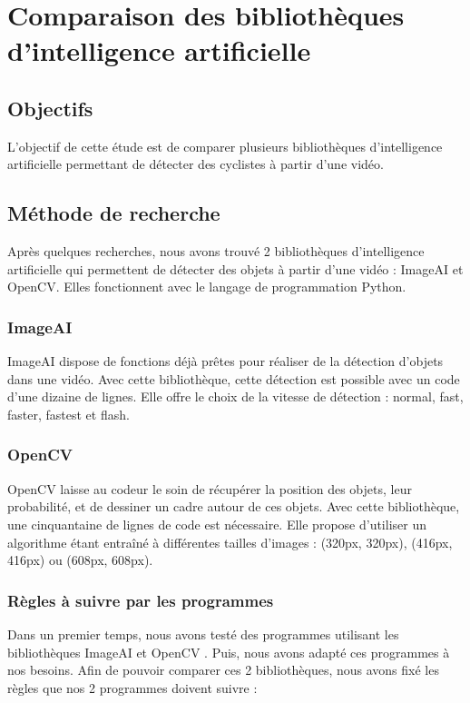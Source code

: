 \section{Comparaison des bibliothèques d'intelligence artificielle}
\label{sec:comparaisonIA}

\subsection{Objectifs}
\label{sec:comparaisonIA:objectifs}

L'objectif de cette étude est de comparer plusieurs bibliothèques d'intelligence artificielle
permettant de détecter des cyclistes à partir d'une vidéo.

\subsection{Méthode de recherche}
\label{sec:comparaisonIA:methode_recherche}

Après quelques recherches, nous avons trouvé 2 bibliothèques d'intelligence artificielle 
qui permettent de détecter des objets à partir d'une vidéo : ImageAI et OpenCV.
Elles fonctionnent avec le langage de programmation Python.

\subsubsection{ImageAI}
\label{sec:comparaisonIA:methode_recherche:imageAI}

ImageAI dispose de fonctions déjà prêtes pour réaliser de la détection d'objets dans une vidéo.
Avec cette bibliothèque, cette détection est possible avec un code d'une dizaine de lignes.
Elle offre le choix de la vitesse de détection : normal, fast, faster, fastest et flash.

\subsubsection{OpenCV}
\label{sec:comparaisonIA:methode_recherche:openCV}

OpenCV laisse au codeur le soin de récupérer la position des objets, leur probabilité, et de dessiner un cadre autour de ces objets.
Avec cette bibliothèque, une cinquantaine de lignes de code est nécessaire.
Elle propose d'utiliser un algorithme étant entraîné à différentes tailles d'images : (320px, 320px), (416px, 416px) ou (608px, 608px).

\subsubsection{Règles à suivre par les programmes}
\label{sec:comparaisonIA:methode_recherche:regles}
Dans un premier temps, nous avons testé des programmes utilisant les bibliothèques ImageAI et OpenCV \cite{ImageAI, OpenCV}.
Puis, nous avons adapté ces programmes à nos besoins.
Afin de pouvoir comparer ces 2 bibliothèques, nous avons fixé les règles que nos 2 programmes doivent suivre :

